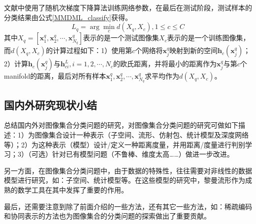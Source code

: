 文献\cite{Deeplearning_MMDML}中使用了随机次梯度下降算法训练网络参数，在最后在测试阶段，测试样本的分类结果由公式\ref{MMDML_classify}获得。
\begin{equation}
\label{MMDML_classify}
L_q=\arg\min_c d(X_q,X_c),1\leq c\leq C
\end{equation}
其中$X_q=[\bm{x}_1^q,\bm{x}_2^q,\cdots,\bm{x}_{N_q}^q]$表示的是一个测试图像集$X_c$表示的是一个训练图像集，而$d(X_q,X_c)$的计算过程如下：1）使用第$c$个网络将$\bm{x}_j^q$映射到新的空间$\bm{h}_c (\bm{x}_j^q )$；2）计算$\bm{h}_c (\bm{x}_j^q )$与$\bm{h}_{ci}^L,i=1,2,\cdots,N_c$的欧氏距离，并将最小的距离作为$\bm{x}_j^q$与第$c$个manifold的距离，最后对所有样本$\bm{x}_1^q,\bm{x}_2^q,\cdots,\bm{x}_{N_q}^q$求平均作为$d(X_q,X_c)$。
\subsection{国内外研究现状小结}
\label{sec:current_Summarize}
总结国内外对图像集合分类问题的研究，对图像集合分类问题的研究可做如下描述：1）为图像集合设计一种表示（子空间、流形、仿射包、统计模型及深度网络等）；2）为这种表示（模型）设计/定义一种距离度量，并用距离/度量进行判别学习；3）（可选）针对已有模型问题（不鲁棒、维度太高……）做进一步改进。

另一方面，在图像集合分类问题中，由于数据的特殊性，往往需要对非线性的数据模型进行研究，如：子空间、统计模型等。在这些模型的研究中，黎曼流形作为成熟的数学工具在其中发挥了重要的作用。 

最后，还需要注意到除了前面介绍的一些方法，还有其它一些方法，如：稀疏编码和协同表示的方法也为图像集合的分类问题的探索做出了重要贡献。
